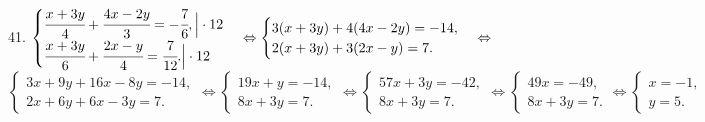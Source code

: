 41. $\begin{cases}\cfrac{x+3y}{4}+\cfrac{4x-2y}{3}=-\cfrac{7}{6},\Big|\cdot12\\ \cfrac{x+3y}{6}+\cfrac{2x-y}{4}=\cfrac{7}{12}.\Big|\cdot12 \end{cases}\Leftrightarrow
\begin{cases} 3(x+3y)+4(4x-2y)=-14,\\ 2(x+3y)+3(2x-y)=7.\end{cases}\Leftrightarrow$\\$
\begin{cases} 3x+9y+16x-8y=-14,\\ 2x+6y+6x-3y=7.\end{cases}\Leftrightarrow
\begin{cases} 19x+y=-14,\\ 8x+3y=7.\end{cases}\Leftrightarrow
\begin{cases} 57x+3y=-42,\\ 8x+3y=7.\end{cases}\Leftrightarrow
\begin{cases} 49x=-49,\\ 8x+3y=7.\end{cases}\Leftrightarrow
\begin{cases} x=-1,\\ y=5.\end{cases}$\\
